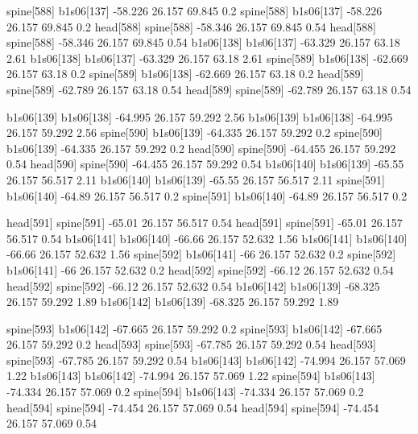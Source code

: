 spine[588]    b1s06[137]    -58.226    26.157    69.845    0.2
spine[588]    b1s06[137]    -58.226    26.157    69.845    0.2
head[588]    spine[588]    -58.346    26.157    69.845    0.54
head[588]    spine[588]    -58.346    26.157    69.845    0.54
b1s06[138]    b1s06[137]    -63.329    26.157    63.18    2.61
b1s06[138]    b1s06[137]    -63.329    26.157    63.18    2.61
spine[589]    b1s06[138]    -62.669    26.157    63.18    0.2
spine[589]    b1s06[138]    -62.669    26.157    63.18    0.2
head[589]    spine[589]    -62.789    26.157    63.18    0.54
head[589]    spine[589]    -62.789    26.157    63.18    0.54


b1s06[139]    b1s06[138]    -64.995    26.157    59.292    2.56
b1s06[139]    b1s06[138]    -64.995    26.157    59.292    2.56
spine[590]    b1s06[139]    -64.335    26.157    59.292    0.2
spine[590]    b1s06[139]    -64.335    26.157    59.292    0.2
head[590]    spine[590]    -64.455    26.157    59.292    0.54
head[590]    spine[590]    -64.455    26.157    59.292    0.54
b1s06[140]    b1s06[139]    -65.55    26.157    56.517    2.11
b1s06[140]    b1s06[139]    -65.55    26.157    56.517    2.11
spine[591]    b1s06[140]    -64.89    26.157    56.517    0.2
spine[591]    b1s06[140]    -64.89    26.157    56.517    0.2


head[591]    spine[591]    -65.01    26.157    56.517    0.54
head[591]    spine[591]    -65.01    26.157    56.517    0.54
b1s06[141]    b1s06[140]    -66.66    26.157    52.632    1.56
b1s06[141]    b1s06[140]    -66.66    26.157    52.632    1.56
spine[592]    b1s06[141]    -66    26.157    52.632    0.2
spine[592]    b1s06[141]    -66    26.157    52.632    0.2
head[592]    spine[592]    -66.12    26.157    52.632    0.54
head[592]    spine[592]    -66.12    26.157    52.632    0.54
b1s06[142]    b1s06[139]    -68.325    26.157    59.292    1.89
b1s06[142]    b1s06[139]    -68.325    26.157    59.292    1.89


spine[593]    b1s06[142]    -67.665    26.157    59.292    0.2
spine[593]    b1s06[142]    -67.665    26.157    59.292    0.2
head[593]    spine[593]    -67.785    26.157    59.292    0.54
head[593]    spine[593]    -67.785    26.157    59.292    0.54
b1s06[143]    b1s06[142]    -74.994    26.157    57.069    1.22
b1s06[143]    b1s06[142]    -74.994    26.157    57.069    1.22
spine[594]    b1s06[143]    -74.334    26.157    57.069    0.2
spine[594]    b1s06[143]    -74.334    26.157    57.069    0.2
head[594]    spine[594]    -74.454    26.157    57.069    0.54
head[594]    spine[594]    -74.454    26.157    57.069    0.54


